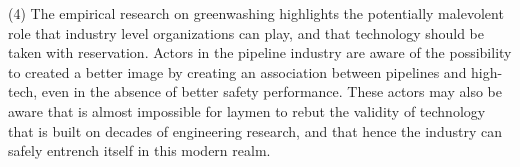 (4) The empirical research on greenwashing highlights the potentially malevolent role that industry level organizations can play, and that technology should be taken with reservation. Actors in the pipeline industry are aware of the possibility to created a better image by creating an association between pipelines and high-tech, even in the absence of better safety performance. These actors may also be aware that is almost impossible for laymen to rebut the validity of technology that is built on decades of engineering research, and that hence the industry can safely entrench itself in this modern realm.



